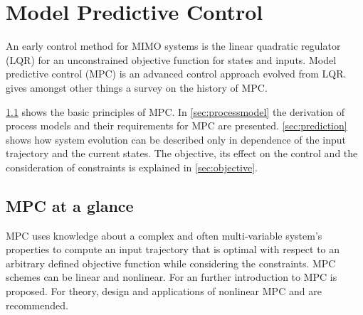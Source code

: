 \chapter{Model Predictive Control}
\label{cha:mpc}

An early control method for MIMO systems is the linear quadratic regulator (LQR) for an unconstrained objective function for states and inputs.
Model predictive control (MPC) is an advanced control approach evolved from LQR.
\cite{Morari.1999} gives amongst other things a survey on the history of MPC.

\cref{sec:mpc_glance} shows the basic principles of MPC. 
In \cref{sec:processmodel} the derivation of process models and their requirements for MPC are presented.
\cref{sec:prediction} shows how system evolution can be described only in dependence of the input trajectory and the current states.
The objective, its effect on the control and the consideration of constraints is explained in \cref{sec:objective}.


\section{MPC at a glance}
\label{sec:mpc_glance}

MPC uses knowledge about a complex and often multi-variable system's properties to compute an input trajectory that is optimal with respect to an arbitrary defined objective function while considering the constraints.
MPC schemes can be linear and nonlinear.
For an further introduction to MPC \cite{Rawlings.2009} is proposed. For theory, design and applications of nonlinear MPC  \cite{Grune.2011} and \cite{Grancharova.2012b} are recommended.

